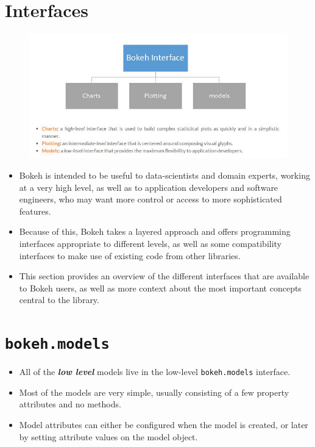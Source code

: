 \documentclass[a4paper,12pt]{article}
\begin{document}
\section*{Interfaces}
\begin{figure}[h!]
	\centering
	\includegraphics[width=1.1\linewidth]{images/00-Interfaces}
\end{figure}
\begin{itemize}
	\item Bokeh is intended to be useful to data-scientists and domain experts, working at a very high level, as well as to application developers and software engineers, who may want more control or access to more sophisticated features. 
	\item Because of this, Bokeh takes a layered approach and offers programming interfaces appropriate to different levels, as well as some compatibility interfaces to make use of existing code from other libraries. 
	
	\item This section provides an overview of the different interfaces that are available to Bokeh users, as well as more context about the most important concepts central to the library. 
\end{itemize}



\newpage

\section*{\texttt{bokeh.models}}

\begin{itemize}
	\item All of the \textbf{\textit{low level}} models live in the low-level \texttt{bokeh.models} interface. \item Most of the models are very simple, usually consisting of a few property attributes and no methods. 
	\item Model attributes can either be configured when the model is created, or later by setting attribute values on the model object. 
	
\end{itemize}
\end{document}
